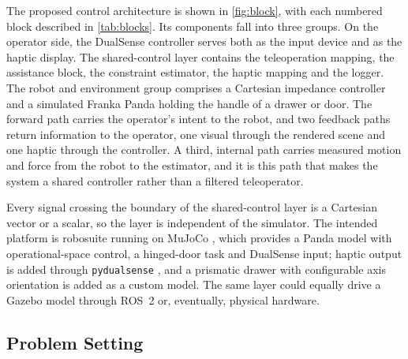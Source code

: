 \documentclass[11pt,letterpaper]{article}
\begin{document}
The proposed control architecture is shown in \cref{fig:block}, with each numbered block described in \cref{tab:blocks}. Its components fall into three groups. On the operator side, the DualSense controller serves both as the input device and as the haptic display. The shared-control layer contains the teleoperation mapping, the assistance block, the constraint estimator, the haptic mapping and the logger. The robot and environment group comprises a Cartesian impedance controller and a simulated Franka Panda holding the handle of a drawer or door. The forward path carries the operator's intent to the robot, and two feedback paths return information to the operator, one visual through the rendered scene and one haptic through the controller. A third, internal path carries measured motion and force from the robot to the estimator, and it is this path that makes the system a shared controller rather than a filtered teleoperator.

Every signal crossing the boundary of the shared-control layer is a Cartesian vector or a scalar, so the layer is independent of the simulator. The intended platform is robosuite \cite{zhu2020robosuite} running on MuJoCo \cite{todorov2012mujoco}, which provides a Panda model with operational-space control, a hinged-door task and DualSense input; haptic output is added through \texttt{pydualsense} \cite{pydualsense}, and a prismatic drawer with configurable axis orientation is added as a custom model. The same layer could equally drive a Gazebo model through ROS~2 or, eventually, physical hardware.




\subsection{Problem Setting}
\label{sec:setting}
\end{document}
